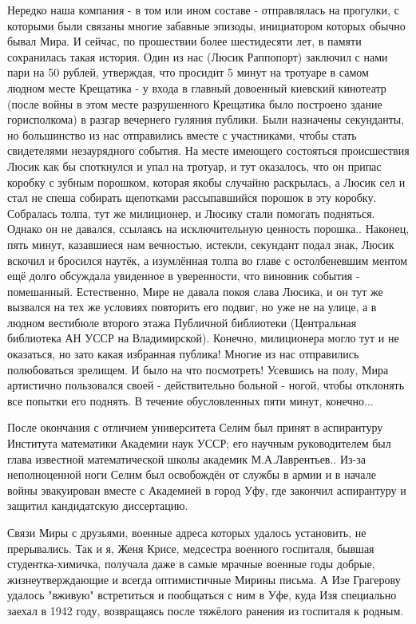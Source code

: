 Нередко наша компания - в том или ином составе - отправлялась на прогулки, с которыми были связаны многие забавные эпизоды, инициатором которых обычно бывал Мира. И сейчас, по прошествии более шестидесяти лет, в памяти сохранилась такая история. Один из нас (Люсик Раппопорт) заключил с нами пари на 50 рублей, утверждая, что просидит 5 минут на тротуаре в самом людном месте Крещатика - у входа в главный довоенный киевский кинотеатр (после войны в этом месте разрушенного Крещатика было построено здание горисполкома) в разгар вечернего гуляния публики. Были назначены секунданты, но большинство из нас отправились вместе с участниками, чтобы стать свидетелями незаурядного события. На месте имеющего состояться происшествия Люсик как бы споткнулся и упал на тротуар, и тут оказалось, что он припас коробку с зубным порошком, которая якобы случайно раскрылась, а Люсик сел и стал не спеша собирать щепотками рассыпавшийся порошок в эту коробку. Собралась толпа, тут же милиционер, и Люсику стали помогать подняться. Однако он не давался, ссылаясь на исключительную ценность порошка.. Наконец, пять минут, казавшиеся нам вечностью, истекли, секундант подал знак, Люсик вскочил и бросился наутёк, а изумлённая толпа во главе с остолбеневшим ментом ещё долго обсуждала увиденное в уверенности, что виновник события - помешанный. Естественно, Мире не давала покоя слава Люсика, и он тут же вызвался на тех же условиях повторить его подвиг, но уже не на улице, а в людном вестибюле второго этажа Публичной библиотеки (Центральная библиотека АН УССР на Владимирской). Конечно, милиционера могло тут и не оказаться, но зато какая избранная публика! Многие из нас отправились полюбоваться зрелищем. И было на что посмотреть! Усевшись на полу, Мира артистично пользовался своей - действительно больной - ногой, чтобы отклонять все попытки его поднять. В течение обусловленных пяти минут, конечно...

После окончания с отличием университета Селим был принят в аспирантуру Института математики Академии наук УССР; его научным руководителем был глава известной математической школы академик М.А.Лаврентьев.. Из-за неполноценной ноги Селим был освобождён от службы в армии и в начале войны эвакуирован вместе с Академией в город Уфу, где закончил аспирантуру и защитил
кандидатскую диссертацию.

Связи Миры с друзьями, военные адреса которых удалось установить, не прерывались. Так и я, Женя Крисе, медсестра военного госпиталя, бывшая студентка-химичка, получала даже в самые мрачные военные годы добрые, жизнеутверждающие и всегда оптимистичные Мирины письма. А Изе Грагерову удалось "вживую" встретиться и пообщаться с ним в Уфе, куда Изя специально заехал в 1942 году, возвращаясь после тяжёлого ранения из госпиталя к родным.

